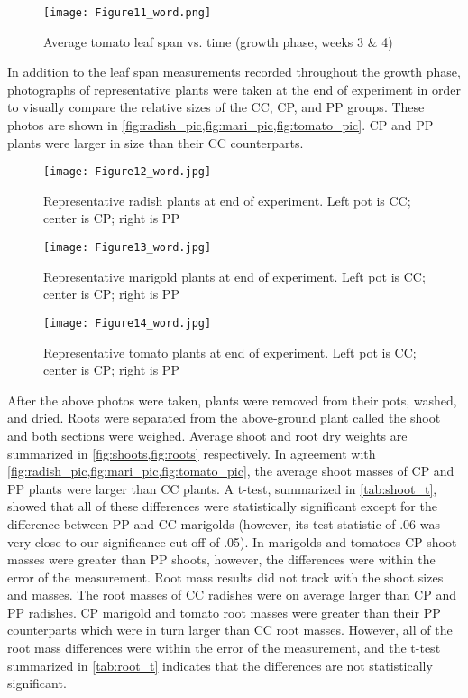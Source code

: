 \begin{figure}[htbp]
  \centering
  \texttt{[image: Figure11\_word.png]}
  \caption{Average tomato leaf span vs. time (growth phase, weeks 3 \& 4)}
  \label{fig:tomato_span}
\end{figure}

In addition to the leaf span measurements recorded throughout the growth phase, photographs of representative plants were taken at the end of experiment in order to visually compare the relative sizes of the CC, CP, and PP groups.  These photos are shown in \cref{fig:radish_pic,fig:mari_pic,fig:tomato_pic}. CP and PP plants were larger in size than their CC counterparts.

\begin{figure}[htbp]
  \centering
  \texttt{[image: Figure12\_word.jpg]}
  \caption{Representative radish plants at end of experiment. Left pot is CC; center is CP; right is PP}
  \label{fig:radish_pic}
\end{figure}

\begin{figure}[htbp]
  \centering
  \texttt{[image: Figure13\_word.jpg]}
  \caption{Representative marigold plants at end of experiment. Left pot is CC; center is CP; right is PP}
  \label{fig:mari_pic}
\end{figure}

\begin{figure}[htbp]
  \centering
  \texttt{[image: Figure14\_word.jpg]}
  \caption{Representative tomato plants at end of experiment. Left pot is CC; center is CP; right is PP}
  \label{fig:tomato_pic}
\end{figure}

After the above photos were taken, plants were removed from their pots, washed, and dried.  Roots were separated from the above-ground plant called the shoot and both sections were weighed.  Average shoot and root dry weights are summarized in \cref{fig:shoots,fig:roots} respectively.  In agreement with \cref{fig:radish_pic,fig:mari_pic,fig:tomato_pic}, the average shoot masses of CP and PP plants were larger than CC plants.  A t-test, summarized in \cref{tab:shoot_t}, showed that all of these differences were statistically significant except for the difference between PP and CC marigolds (however, its test statistic of .06 was very close to our significance cut-off of .05).  In marigolds and tomatoes CP shoot masses were greater than PP shoots, however, the differences were within the error of the measurement.  Root mass results did not track with the shoot sizes and masses.  The root masses of CC radishes were on average larger than CP and PP radishes. CP marigold and tomato root masses were greater than their PP counterparts which were in turn larger than CC root masses.  However, all of the root mass differences were within the error of the measurement, and the t-test summarized in \cref{tab:root_t} indicates that the differences are not statistically significant.

